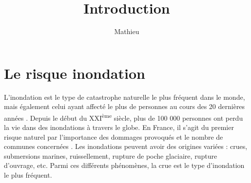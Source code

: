 \documentclass[11pt]{article}
\title{Introduction}
\author{Mathieu}
\begin{document}
\maketitle

\tableofcontents

\newpage

\section{Le risque inondation}

	\paragraph{} L'inondation est le type de catastrophe naturelle le plus fréquent dans le monde, mais également celui ayant affecté le plus de personnes au cours des 20 dernières années \citep{undrr_human_2020}. Depuis le début du XXI\textsuperscript{ème} siècle, plus de 100 000 personnes ont perdu la vie dans des inondations à travers le globe. En France, il s'agit du premier risque naturel par l'importance des dommages provoqués et le nombre de communes concernées \citep{medd_site_nodate}. Les inondations peuvent avoir des origines variées : crues, submersions marines, ruissellement, rupture de poche glaciaire, rupture d'ouvrage, etc. Parmi ces différents phénomènes, la crue est le type d'inondation le plus fréquent. 
	
\end{document}
